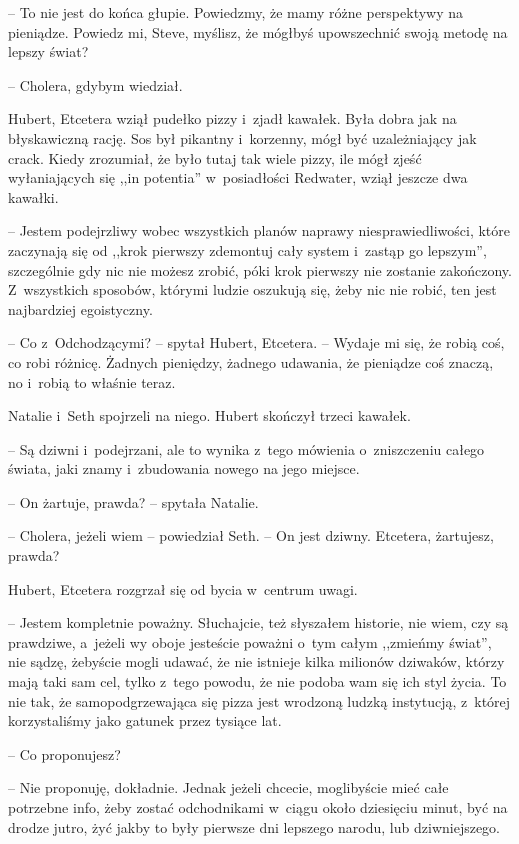 \documentclass[oneside,polish,11pt,sfheadings]{mwbk}
\begin{document}
-- To nie jest do końca głupie. Powiedzmy, że mamy różne perspektywy na
pieniądze. Powiedz mi, Steve, myślisz, że mógłbyś upowszechnić swoją
metodę na lepszy świat?

-- Cholera, gdybym wiedział.

Hubert, Etcetera wziął pudełko pizzy i~zjadł kawałek. Była dobra jak na
błyskawiczną rację. Sos był pikantny i~korzenny, mógł być uzależniający
jak crack. Kiedy zrozumiał, że było tutaj tak wiele pizzy, ile mógł
zjeść wyłaniających się ,,in potentia'' w~posiadłości Redwater, wziął
jeszcze dwa kawałki.

-- Jestem podejrzliwy wobec wszystkich planów naprawy niesprawiedliwości,
które zaczynają się od ,,krok pierwszy zdemontuj cały system i~zastąp go
lepszym'', szczególnie gdy nic nie możesz zrobić, póki krok pierwszy
nie zostanie zakończony. Z~wszystkich sposobów, którymi ludzie oszukują
się, żeby nic nie robić, ten jest najbardziej egoistyczny.

-- Co z~Odchodzącymi? -- spytał Hubert, Etcetera. -- Wydaje mi się, że
robią coś, co robi różnicę. Żadnych pieniędzy, żadnego udawania, że
pieniądze coś znaczą, no i~robią to właśnie teraz.

Natalie i~Seth spojrzeli na niego. Hubert skończył trzeci kawałek. 

-- Są
dziwni i~podejrzani, ale to wynika z~tego mówienia o~zniszczeniu całego
świata, jaki znamy i~zbudowania nowego na jego miejsce.

-- On żartuje, prawda? -- spytała Natalie.

-- Cholera, jeżeli wiem -- powiedział Seth. -- On jest dziwny. Etcetera,
żartujesz, prawda?

Hubert, Etcetera rozgrzał się od bycia w~centrum uwagi. 

-- Jestem
kompletnie poważny. Słuchajcie, też słyszałem historie, nie wiem, czy są
prawdziwe, a~jeżeli wy oboje jesteście poważni o~tym całym ,,zmieńmy
świat'', nie sądzę, żebyście mogli udawać, że nie istnieje kilka
milionów dziwaków, którzy mają taki sam cel, tylko z~tego powodu, że nie
podoba wam się ich styl życia. To nie tak, że samopodgrzewająca się
pizza jest wrodzoną ludzką instytucją, z~której korzystaliśmy jako
gatunek przez tysiące lat.

-- Co proponujesz?

-- Nie proponuję, dokładnie. Jednak jeżeli chcecie, moglibyście mieć całe
potrzebne info, żeby zostać odchodnikami w~ciągu około dziesięciu minut,
być na drodze jutro, żyć jakby to były pierwsze dni lepszego narodu, lub
dziwniejszego.
\end{document}

